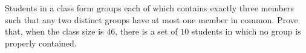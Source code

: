 Students in a class form groups each of which contains exactly three members such that any two distinct groups have at most one member in common. Prove that, when the class size is $ 46$, there is a set of $ 10$ students in which no group is properly contained.